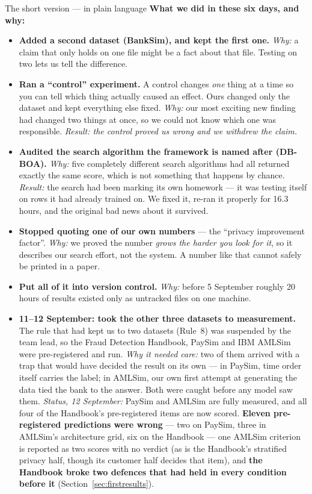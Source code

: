 \documentclass[11pt]{article}
\begin{document}
\begin{keybox}{The short version --- in plain language}
\smallskip
\textbf{What we did in these six days, and why:}
\begin{itemize}
  \item \textbf{Added a second dataset (BankSim), and kept the first one.} \emph{Why:} a claim that
  only holds on one file might be a fact about that file. Testing on two lets us tell the difference.
  \item \textbf{Ran a ``control'' experiment.} A control changes \emph{one} thing at a time so you can
  tell which thing actually caused an effect. Ours changed only the dataset and kept everything else
  fixed. \emph{Why:} our most exciting new finding had changed two things at once, so we could not
  know which one was responsible. \emph{Result: the control proved us wrong and we withdrew the claim.}
  \item \textbf{Audited the search algorithm the framework is named after (DB-BOA).} \emph{Why:} five
  completely different search algorithms had all returned exactly the same score, which is not
  something that happens by chance. \emph{Result:} the search had been marking its own homework --- it
  was testing itself on rows it had already trained on. We fixed it, re-ran it properly for 16.3 hours,
  and the original bad news about it survived.
  \item \textbf{Stopped quoting one of our own numbers} --- the ``privacy improvement factor''.
  \emph{Why:} we proved the number \emph{grows the harder you look for it}, so it describes our search
  effort, not the system. A number like that cannot safely be printed in a paper.
  \item \textbf{Put all of it into version control.} \emph{Why:} before 5 September roughly 20 hours of
  results existed only as untracked files on one machine.
  \item \textbf{11--12 September: took the other three datasets to measurement.} The rule that had kept
  us to two datasets (Rule~8) was suspended by the team lead, so the Fraud Detection Handbook, PaySim and
  IBM AMLSim were pre-registered and run. \emph{Why it needed care:} two of them arrived with a trap that
  would have decided the result on its own --- in PaySim, time order itself carries the label; in AMLSim,
  our own first attempt at generating the data tied the bank to the answer. Both were caught before any
  model saw them. \emph{Status, 12 September:} PaySim and AMLSim are fully measured, and all four of the Handbook's
  pre-registered items are now scored. \textbf{Eleven pre-registered predictions were wrong} --- two on
  PaySim, three in AMLSim's architecture grid, six on the Handbook --- one AMLSim criterion is reported as
  two scores with no verdict (as is the Handbook's stratified privacy half, though its customer half
  decides that item), and \textbf{the Handbook broke two defences that had held in every condition before it}
  (Section~\ref{sec:firstresults}).
\end{itemize}


\end{keybox}
\end{document}
